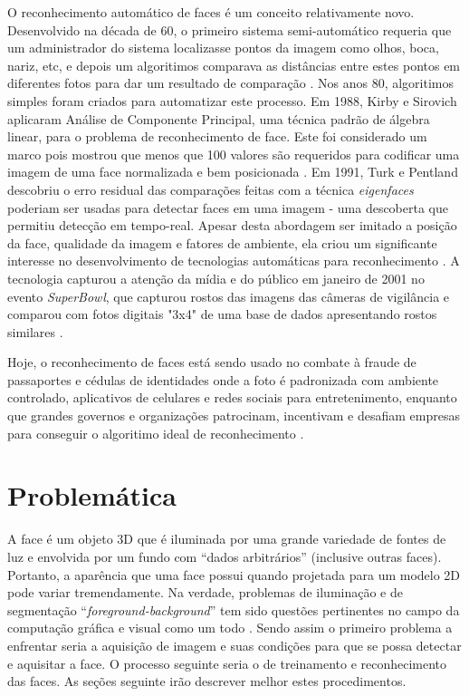 O reconhecimento automático de faces é um conceito relativamente novo. Desenvolvido na década de 60, o primeiro sistema semi-automático requeria que um administrador do sistema localizasse pontos da imagem como olhos, boca, nariz,  etc, e depois um algoritimos comparava as distâncias entre estes pontos em diferentes fotos para dar um resultado de comparação \cite{nstc_homeland}. Nos anos 80, algoritimos simples foram criados para automatizar este processo. Em 1988, Kirby e Sirovich aplicaram Análise de Componente Principal, uma técnica padrão de álgebra linear, para o problema de reconhecimento de face. Este foi considerado um marco pois mostrou que menos que 100 valores são requeridos para codificar uma imagem de uma face normalizada e bem posicionada \cite{nstc_homeland}. Em 1991, Turk e Pentland descobriu o erro residual das comparações feitas com a técnica \textit{eigenfaces} poderiam ser usadas para detectar faces em uma imagem - uma descoberta que permitiu detecção em tempo-real. Apesar desta abordagem ser imitado a posição da face, qualidade da imagem e fatores de ambiente, ela criou um significante interesse no desenvolvimento de tecnologias automáticas para reconhecimento \cite{nstc_homeland}. A tecnologia capturou a atenção da mídia e do público em janeiro de 2001 no evento \textit{SuperBowl}, que capturou rostos das imagens das câmeras de vigilância e comparou com fotos digitais "3x4" de uma base de dados apresentando rostos similares \cite{nstc_homeland}.

Hoje, o reconhecimento de faces está sendo usado no combate à fraude de passaportes e cédulas de identidades onde a foto é padronizada com ambiente controlado, aplicativos de celulares e redes sociais para entretenimento, enquanto que grandes governos e organizações patrocinam, incentivam e desafiam empresas para conseguir o algoritimo ideal de reconhecimento \cite{nyu_ccpr_frt}.



\section{Problemática}\label{sec:problematica}

A face é um objeto 3D que é iluminada por uma grande variedade de fontes de luz e envolvida por um fundo com “dados arbitrários” (inclusive outras faces). Portanto, a aparência que uma face possui quando projetada para um modelo 2D pode variar tremendamente. Na verdade, problemas de iluminação e de segmentação “\textit{foreground-background}” tem sido questões pertinentes no campo da computação gráfica e visual como um todo \cite{tony_columbia}. Sendo assim o primeiro problema a enfrentar seria a aquisição de imagem e suas condições para que se possa detectar e aquisitar a face. O processo seguinte seria o de treinamento e reconhecimento das faces. As seções seguinte irão descrever melhor estes procedimentos. 


